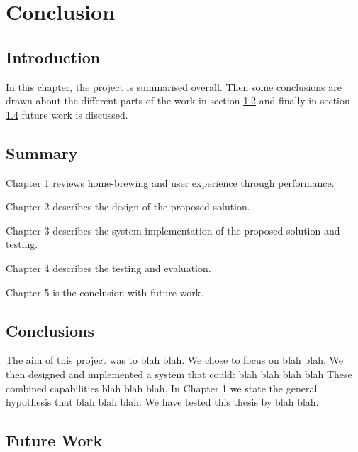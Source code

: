 \chapter{Conclusion} \label{c}

\section{Introduction} \label{c--introduction}

In this chapter, the project is summarised overall. Then some conclusions are drawn about the different parts of the work in section \ref{c--summary} and finally in section \ref{c--future-work} future work is discussed.

\section{Summary} \label{c--summary}

Chapter 1 reviews home-brewing and user experience through performance.

Chapter 2 describes the design of the proposed solution.

Chapter 3 describes the system implementation of the proposed solution and testing.

Chapter 4 describes the testing and evaluation.

Chapter 5 is the conclusion with future work.

\section{Conclusions} \label{c--conclusions}

The aim of this project was to blah blah.  We chose to focus on blah blah.
We then designed and implemented a system that could:
blah
blah
blah
blah
These combined capabilities blah blah blah.
In Chapter 1 we state the general hypothesis that blah blah blah. We have tested this thesis by blah blah.

\section{Future Work} \label{c--future-work}





